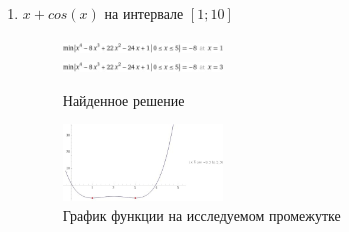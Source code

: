 \documentclass[12pt]{article}
\begin{document}
\begin{enumerate}
\newpage
\item $x+cos(x)$ на интервале $[1; 10]$

\begin{figure}[h]
\centering
\includegraphics[width=0.4\textwidth]{images/1loc1.jpg} \\
\includegraphics[width=0.4\textwidth]{images/1loc2.jpg}
\caption{Найденное решение}
\end{figure}

\begin{figure}[h]
\centering
\includegraphics[width=0.4\textwidth]{images/1loc3.jpg}
\caption{График функции на исследуемом промежутке}
\end{figure}


\end{enumerate}
\end{document}
